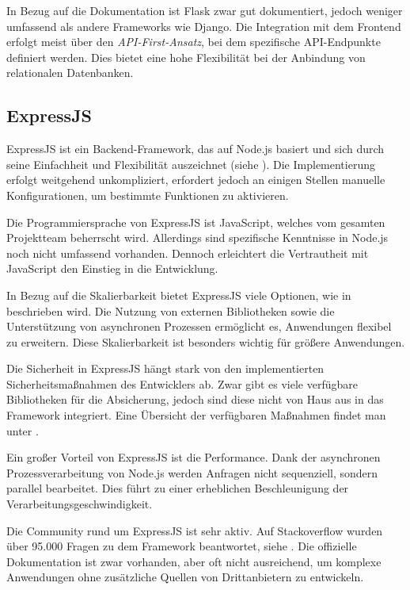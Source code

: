 In Bezug auf die Dokumentation ist Flask zwar gut dokumentiert, jedoch weniger umfassend als andere Frameworks wie Django. Die Integration mit dem Frontend erfolgt meist über den \textit{API-First-Ansatz}, bei dem spezifische API-Endpunkte definiert werden. Dies bietet eine hohe Flexibilität bei der Anbindung von relationalen Datenbanken.


\subsection{ExpressJS}
ExpressJS ist ein Backend-Framework, das auf Node.js basiert und sich durch seine Einfachheit und Flexibilität auszeichnet (siehe \cite{website-expressjs}). Die Implementierung erfolgt weitgehend unkompliziert, erfordert jedoch an einigen Stellen manuelle Konfigurationen, um bestimmte Funktionen zu aktivieren.

Die Programmiersprache von ExpressJS ist JavaScript, welches vom gesamten Projektteam beherrscht wird. Allerdings sind spezifische Kenntnisse in Node.js noch nicht umfassend vorhanden. Dennoch erleichtert die Vertrautheit mit JavaScript den Einstieg in die Entwicklung.

In Bezug auf die Skalierbarkeit bietet ExpressJS viele Optionen, wie in \cite{website-express-scaling} beschrieben wird. Die Nutzung von externen Bibliotheken sowie die Unterstützung von asynchronen Prozessen ermöglicht es, Anwendungen flexibel zu erweitern. Diese Skalierbarkeit ist besonders wichtig für größere Anwendungen.

Die Sicherheit in ExpressJS hängt stark von den implementierten Sicherheitsmaßnahmen des Entwicklers ab. Zwar gibt es viele verfügbare Bibliotheken für die Absicherung, jedoch sind diese nicht von Haus aus in das Framework integriert. Eine Übersicht der verfügbaren Maßnahmen findet man unter \cite{website-express-security}.

Ein großer Vorteil von ExpressJS ist die Performance. Dank der asynchronen Prozessverarbeitung von Node.js werden Anfragen nicht sequenziell, sondern parallel bearbeitet. Dies führt zu einer erheblichen Beschleunigung der Verarbeitungsgeschwindigkeit.

Die Community rund um ExpressJS ist sehr aktiv. Auf Stackoverflow wurden über 95.000 Fragen zu dem Framework beantwortet, siehe \cite{website-stackoverflow-expressjs}. Die offizielle Dokumentation ist zwar vorhanden, aber oft nicht ausreichend, um komplexe Anwendungen ohne zusätzliche Quellen von Drittanbietern zu entwickeln.

